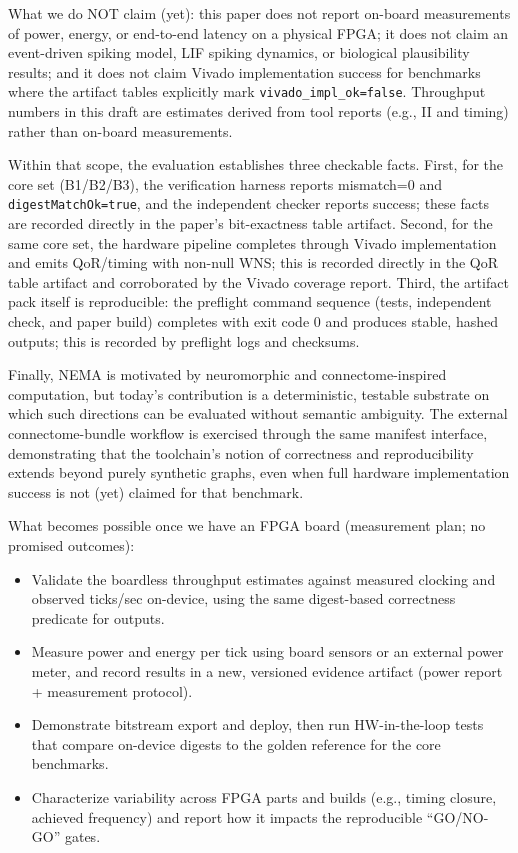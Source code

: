 What we do NOT claim (yet): this paper does not report on-board measurements of power, energy, or end-to-end latency on a physical FPGA; it does not claim an event-driven spiking model, LIF spiking dynamics, or biological plausibility results; and it does not claim Vivado implementation success for benchmarks where the artifact tables explicitly mark \texttt{vivado\_impl\_ok=false}. Throughput numbers in this draft are estimates derived from tool reports (e.g., II and timing) rather than on-board measurements.

Within that scope, the evaluation establishes three checkable facts. First, for the core set (B1/B2/B3), the verification harness reports mismatch=0 and \texttt{digestMatchOk=true}, and the independent checker reports success; these facts are recorded directly in the paper's bit-exactness table artifact. Second, for the same core set, the hardware pipeline completes through Vivado implementation and emits QoR/timing with non-null WNS; this is recorded directly in the QoR table artifact and corroborated by the Vivado coverage report. Third, the artifact pack itself is reproducible: the preflight command sequence (tests, independent check, and paper build) completes with exit code 0 and produces stable, hashed outputs; this is recorded by preflight logs and checksums.

Finally, NEMA is motivated by neuromorphic and connectome-inspired computation, but today's contribution is a deterministic, testable substrate on which such directions can be evaluated without semantic ambiguity. The external connectome-bundle workflow is exercised through the same manifest interface, demonstrating that the toolchain's notion of correctness and reproducibility extends beyond purely synthetic graphs, even when full hardware implementation success is not (yet) claimed for that benchmark.

What becomes possible once we have an FPGA board (measurement plan; no promised outcomes):
\begin{itemize}
\item Validate the boardless throughput estimates against measured clocking and observed ticks/sec on-device, using the same digest-based correctness predicate for outputs.
\item Measure power and energy per tick using board sensors or an external power meter, and record results in a new, versioned evidence artifact (power report + measurement protocol).
\item Demonstrate bitstream export and deploy, then run HW-in-the-loop tests that compare on-device digests to the golden reference for the core benchmarks.
\item Characterize variability across FPGA parts and builds (e.g., timing closure, achieved frequency) and report how it impacts the reproducible ``GO/NO-GO'' gates.
\end{itemize}

